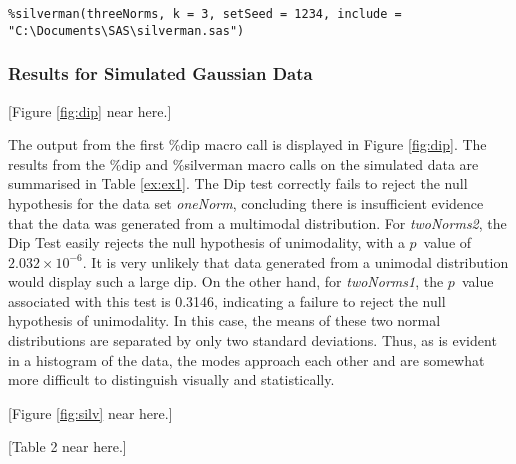 \documentclass[]{interact}
\theoremstyle{plain}%
\theoremstyle{definition}
\theoremstyle{remark}
\begin{document}
\texttt{\%silverman(threeNorms, k = 3, setSeed = 1234, include = "C:\textbackslash Documents\textbackslash SAS\textbackslash silverman.sas")}


\subsubsection{Results for Simulated Gaussian Data}

[Figure \ref{fig:dip} near here.]

The output from the first \%dip macro call is displayed in Figure \ref{fig:dip}. The results from the \%dip and \%silverman macro calls on the simulated data are summarised in Table \ref{ex:ex1}. The Dip test correctly fails to reject the null hypothesis for the data set \textit{oneNorm}, concluding there is insufficient evidence that the data was generated from a multimodal distribution. For \textit{twoNorms2}, the Dip Test easily rejects the null hypothesis of unimodality, with a $p$~value of {$2.032\times10^{-6}$}. It is very unlikely that data generated from a unimodal distribution would display such a large dip.
On the other hand, for \textit{twoNorms1}, the $p$~value associated with this test is 0.3146, indicating a %
failure to reject the null hypothesis of unimodality. In this case, the means of these two normal distributions are separated by only two standard deviations. Thus, as is evident in a histogram of the data, the modes approach each other and are somewhat more difficult to distinguish visually and statistically.%


[Figure \ref{fig:silv} near here.]

[Table 2 near here.]
\end{document}

